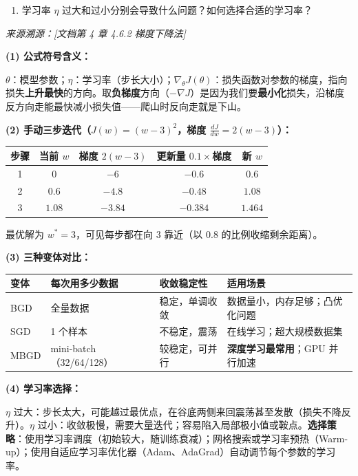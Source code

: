 \documentclass[a4paper,11pt]{ctexart}
\begin{document}
\begin{problembox}
\begin{enumerate}[(1)]
        \item 学习率 $\eta$ 过大和过小分别会导致什么问题？如何选择合适的学习率？
    \end{enumerate}
    {\color{gray}\small\textit{来源溯源：[文档第 4 章 4.6.2 梯度下降法]}}
\end{problembox}

\begin{solutionbox}[参考答案与详细解析]
    \textbf{(1) 公式符号含义：}

    $\theta$：模型参数；$\eta$：学习率（步长大小）；$\nabla_\theta J(\theta)$：损失函数对参数的梯度，指向损失\textbf{上升最快}的方向。取\textbf{负梯度}方向（$-\nabla J$）是因为我们要\textbf{最小化}损失，沿梯度反方向走能最快减小损失值——爬山时反向走就是下山。

    \textbf{(2) 手动三步迭代（$J(w)=(w-3)^2$，梯度 $\frac{dJ}{dw}=2(w-3)$）：}

    \begin{center}
    \begin{tabular}{ccccc}
        \toprule
        步骤 & 当前 $w$ & 梯度 $2(w-3)$ & 更新量 $0.1\times$梯度 & 新 $w$ \\
        \midrule
        1 & 0 & $-6$ & $-0.6$ & $0.6$ \\
        2 & $0.6$ & $-4.8$ & $-0.48$ & $1.08$ \\
        3 & $1.08$ & $-3.84$ & $-0.384$ & $1.464$ \\
        \bottomrule
    \end{tabular}
    \end{center}
    最优解为 $w^*=3$，可见每步都在向 3 靠近（以 0.8 的比例收缩剩余距离）。

    \textbf{(3) 三种变体对比：}
    \begin{center}
    \begin{tabular}{p{2.8cm} p{2.5cm} p{3cm} p{3.5cm}}
        \toprule
        变体 & 每次用多少数据 & 收敛稳定性 & 适用场景 \\
        \midrule
        BGD & 全量数据 & 稳定，单调收敛 & 数据量小，内存足够；凸优化问题 \\[0.8em]
        SGD & 1 个样本 & 不稳定，震荡 & 在线学习；超大规模数据集 \\[0.8em]
        MBGD & mini-batch（32/64/128） & 较稳定，可并行 & \textbf{深度学习最常用}；GPU 并行加速 \\
        \bottomrule
    \end{tabular}
    \end{center}

    \textbf{(4) 学习率选择：}

    $\eta$ 过大：步长太大，可能越过最优点，在谷底两侧来回震荡甚至发散（损失不降反升）。$\eta$ 过小：收敛极慢，需要大量迭代；容易陷入局部极小值或鞍点。\textbf{选择策略}：使用学习率调度（初始较大，随训练衰减）；网格搜索或学习率预热（Warm-up）；使用自适应学习率优化器（Adam、AdaGrad）自动调节每个参数的学习率。
\end{solutionbox}
\end{document}
